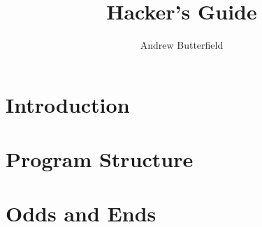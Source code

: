 \documentclass[fleqn]{report}
\author{
  Andrew Butterfield%
  }
\title{\UTP2
  Hacker's Guide
}
\begin{document}


\maketitle
\tableofcontents

\chapter{Introduction}





\chapter{Program Structure}



\chapter{Odds and Ends}


\newpage



\end{document}
